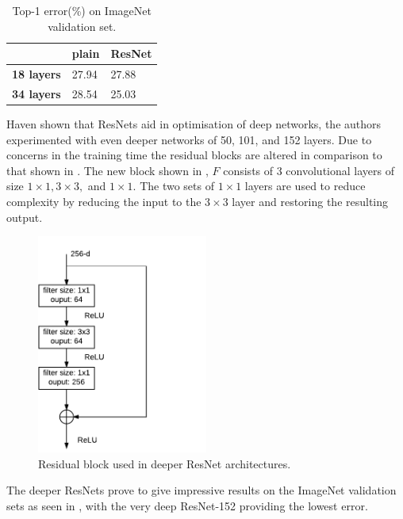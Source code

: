 \begin{table}[h]
\centering
\caption{Top-1 error(\%) on ImageNet validation set.}
\label{tab:plainrestable}
\begin{tabular}{|l|l|l|}
\hline
          & \textbf{plain} & \textbf{ResNet} \\ \hline
\textbf{18 layers} & 27.94 & 27.88  \\ \hline
\textbf{34 layers} & 28.54 & 25.03  \\ \hline
\end{tabular}
\end{table}

Haven shown that ResNets aid in optimisation of deep networks, the authors experimented with even deeper networks of 50, 101, and 152 layers. Due to concerns in the training time the residual blocks are altered in comparison to that shown in . The new block shown in , $F$ consists of 3 convolutional layers of size $1 \times 1, 3 \times 3,$ and $1 \times 1$. The two sets of $1 \times 1$ layers are used to reduce complexity by reducing the input to the $3 \times 3$ layer and restoring the resulting output. 

\begin{figure}[H]
  \centering
    \includegraphics[width=0.5\textwidth]{Figs/Techanal/newresblock.pdf}
    \caption{Residual block used in deeper ResNet architectures.}
    \label{fig:newresblock}
\end{figure}


The deeper ResNets prove to give impressive results on the ImageNet validation sets as seen in , with the very deep ResNet-152 providing the lowest error.

